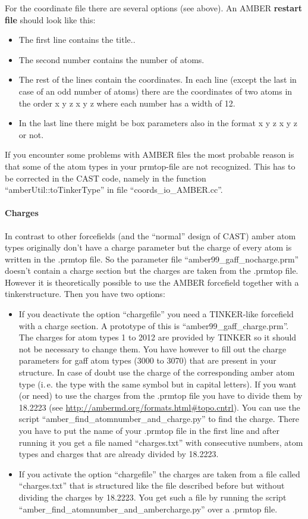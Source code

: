 \documentclass[10pt,a4paper]{article} %
\begin{document}
For the coordinate file there are several options (see above). An AMBER \textbf{restart file }should look like this:
\begin{itemize}
\item The first line contains the title..
\item The second number contains the number of atoms.
\item The rest of the lines contain the coordinates. In each line (except the last in case of an odd number of atoms) there are the coordinates of two atoms in the order x y z x y z where each number has a width of 12.
\item In the last line there might be box parameters also in the format x y z x y z or not.
\end{itemize}

If you encounter some problems with \ac{AMBER} files the most probable reason is that some of the atom types in your prmtop-file are not recognized. This has to be corrected in the \ac{CAST} code, namely in the function ``amberUtil::toTinkerType'' in file ``coords\_io\_AMBER.cc''.

\paragraph{Charges}

In contrast to other forcefields (and the ``normal'' design of CAST) amber atom types originally don't have a charge parameter but the charge of every atom is written in the .prmtop file. So the parameter file ``amber99\_gaff\_nocharge.prm'' doesn't contain a charge section but the charges are taken from the .prmtop file. However it is theoretically possible to use the AMBER forcefield together with a tinkerstructure. Then you have two options:
\begin{itemize}
\item If you deactivate the option ``chargefile'' you need a TINKER-like forcefield with a charge section. A prototype of this is ``amber99\_gaff\_charge.prm''. The charges for atom types 1 to 2012 are provided by TINKER so it should not be necessary to change them. You have however to fill out the charge parameters for gaff atom types (3000 to 3070) that are present in your structure. In case of doubt use the charge of the corresponding amber atom type (i.\,e. the type with the same symbol but in capital letters). If you want (or need) to use the charges from the .prmtop file you have to divide them by 18.2223 (see \url{http://ambermd.org/formats.html\#topo.cntrl}). You can use the script ``amber\_find\_atomnumber\_and\_charge.py'' to find the charge. There you have to put the name of your .prmtop file in the first line and after running it you get a file named ``charges.txt'' with consecutive numbers, atom types and charges that are already divided by 18.2223.
\item If you activate the option ``chargefile'' the charges are taken from a file called ``charges.txt'' that is structured like the file described before but without dividing the charges by 18.2223. You get such a file by running the script ``amber\_find\_atomnumber\_and\_ambercharge.py'' over a .prmtop file.
\end{itemize}
\end{document}
